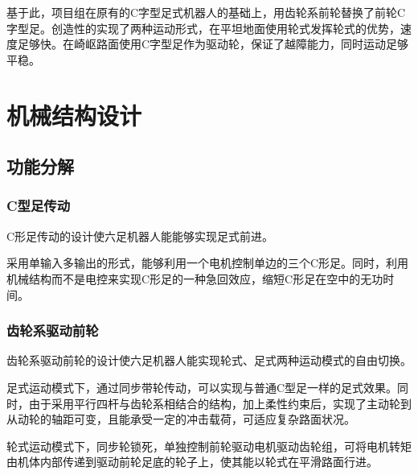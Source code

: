 \documentclass[12pt]{article}
\begin{document}
\begin{CJK}{UTF8}{gbsn}
\par
基于此，项目组在原有的C字型足式机器人的基础上，用齿轮系前轮替换了前轮C字型足。创造性的实现了两种运动形式，在平坦地面使用轮式发挥轮式的优势，速度足够快。在崎岖路面使用C字型足作为驱动轮，保证了越障能力，同时运动足够平稳。


\section{机械结构设计}
\subsection{功能分解}
\subsubsection{C型足传动}
C形足传动的设计使六足机器人能能够实现足式前进。\par
采用单输入多输出的形式，能够利用一个电机控制单边的三个C形足。同时，利用机械结构而不是电控来实现C形足的一种急回效应，缩短C形足在空中的无功时间。
\subsubsection{齿轮系驱动前轮}
	齿轮系驱动前轮的设计使六足机器人能实现轮式、足式两种运动模式的自由切换。\par
	足式运动模式下，通过同步带轮传动，可以实现与普通C型足一样的足式效果。同时，由于采用平行四杆与齿轮系相结合的结构，加上柔性约束后，实现了主动轮到从动轮的轴距可变，且能承受一定的冲击载荷，可适应复杂路面状况。\par
	轮式运动模式下，同步轮锁死，单独控制前轮驱动电机驱动齿轮组，可将电机转矩由机体内部传递到驱动前轮足底的轮子上，使其能以轮式在平滑路面行进。
	

\end{CJK}
\end{document}
